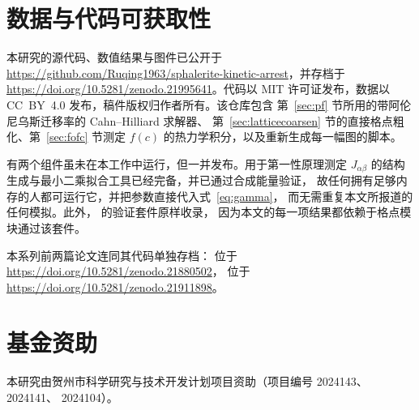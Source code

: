 \documentclass[11pt,a4paper]{ctexart}
\begin{document}
\section*{数据与代码可获取性}
\label{sec:availability}
本研究的源代码、数值结果与图件已公开于
\url{https://github.com/Ruqing1963/sphalerite-kinetic-arrest}，并存档于
\url{https://doi.org/10.5281/zenodo.21995641}。代码以 MIT
许可证发布，数据以 CC~BY~4.0 发布，稿件版权归作者所有。该仓库包含
第~\ref{sec:pf} 节所用的带阿伦尼乌斯迁移率的 Cahn--Hilliard 求解器、
第~\ref{sec:latticecoarsen} 节的直接格点粗化、第~\ref{sec:fofc} 节测定
$f(c)$ 的热力学积分，以及重新生成每一幅图的脚本。

有两个组件虽未在本工作中运行，但一并发布。用于第一性原理测定
$J_{\alpha\beta}$ 的结构生成与最小二乘拟合工具已经完备，并已通过合成能量验证，
故任何拥有足够内存的人都可运行它，并把参数直接代入式~\eqref{eq:gamma}，
而无需重复本文所报道的任何模拟。此外，\citet{yu2026} 的验证套件原样收录，
因为本文的每一项结果都依赖于格点模块通过该套件。

本系列前两篇论文连同其代码单独存档：\citet{yu2026} 位于
\url{https://doi.org/10.5281/zenodo.21880502}，\citet{yu2026b} 位于
\url{https://doi.org/10.5281/zenodo.21911898}。

\section*{基金资助}
本研究由贺州市科学研究与技术开发计划项目资助（项目编号 2024143、2024141、
2024104）。
\end{document}
